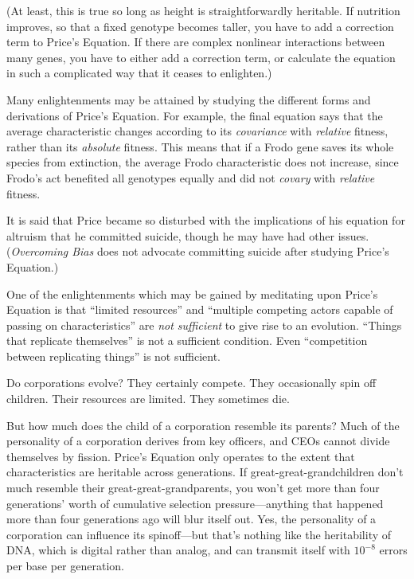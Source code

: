  (At least, this is true so long as height is straightforwardly
heritable. If nutrition improves, so that a fixed genotype becomes
taller, you have to add a correction term to Price's
Equation. If there are complex nonlinear interactions between many
genes, you have to either add a correction term, or calculate the
equation in such a complicated way that it ceases to enlighten.)


 Many enlightenments may be attained by studying the different
forms and derivations of Price's Equation. For example,
the final equation says that the average characteristic changes
according to its \textit{covariance} with \textit{relative} fitness,
rather than its \textit{absolute} fitness. This means that if a Frodo
gene saves its whole species from extinction, the average Frodo
characteristic does not increase, since Frodo's act
benefited all genotypes equally and did not \textit{covary} with
\textit{relative} fitness.


 It is said that Price became so disturbed with the implications of
his equation for altruism that he committed suicide, though he may have
had other issues. (\textit{Overcoming Bias} does not advocate
committing suicide after studying Price's Equation.)


 One of the enlightenments which may be gained by meditating upon
Price's Equation is that ``limited
resources'' and ``multiple competing
actors capable of passing on characteristics'' are
\textit{not sufficient} to give rise to an evolution.
``Things that replicate themselves''
is not a sufficient condition. Even ``competition
between replicating things'' is not sufficient.


 Do corporations evolve? They certainly compete. They occasionally
spin off children. Their resources are limited. They sometimes die.


 But how much does the child of a corporation resemble its parents?
Much of the personality of a corporation derives from key officers, and
CEOs cannot divide themselves by fission. Price's
Equation only operates to the extent that characteristics are heritable
across generations. If great-great-grandchildren don't
much resemble their great-great-grandparents, you won't
get more than four generations' worth of cumulative
selection pressure---anything that happened more than four generations
ago will blur itself out. Yes, the personality of a corporation can
influence its spinoff---but that's nothing like the
heritability of DNA, which is digital rather than analog, and can
transmit itself with $10^{-8}$ errors per base per
generation.


